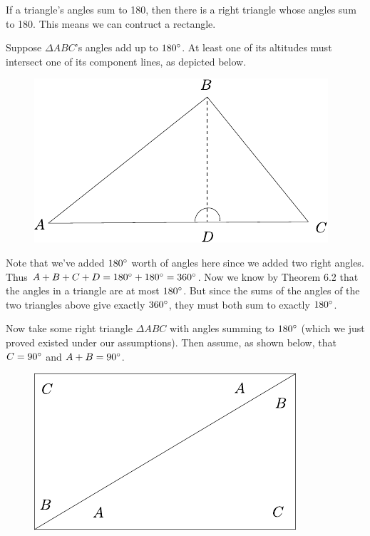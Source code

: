 \documentclass[twoside,10pt]{article}
\begin{document}
\newpage

\begin{exer}[6.7]
If a triangle's angles sum to 180, then there is a right triangle whose angles sum to 180. This means we can contruct a rectangle.
\end{exer}

Suppose $\Delta ABC$'s angles add up to $180^\circ$. At least one of its altitudes must intersect one of its component lines, as depicted below.

\begin{figure}[H]
	\centering
	\includegraphics[scale=1]{fig/7.pdf}
\end{figure}

Note that we've added $180^\circ$ worth of angles here since we added two right angles. Thus $A+B+C+D = 180^\circ + 180^\circ = 360^\circ$. Now we know by Theorem 6.2 that the angles in a triangle are at most $180^\circ$. But since the sums of the angles of the two triangles above give exactly $360^\circ$, they must both sum to exactly $180^\circ$.

Now take some right triangle $\Delta ABC$ with angles summing to $180^\circ$ (which we just proved existed under our assumptions). Then assume, as shown below, that $C=90^\circ$ and $A+B=90^\circ$.

\begin{figure}[H]
	\centering
	\includegraphics[scale=1]{fig/6b.pdf}
\end{figure}
\end{document}
